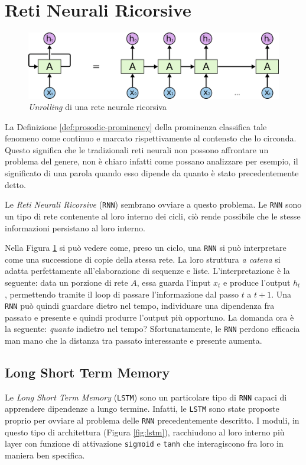 \documentclass[twoside,twocolumn,10pt]{extarticle}
\theoremstyle{definition}
\begin{document}
\section{Reti Neurali Ricorsive}\label{sec:rnn}
	\begin{figure}[h]
		\centering
		\includegraphics[scale=.4]{img/rnn.png}
		\caption{\textit{Unrolling} di una rete neurale ricorsiva}
		\label{fig:unroll}
	\end{figure}
	La Definizione \ref{def:prosodic-prominency} della prominenza classifica tale fenomeno come continuo e marcato rispettivamente al contensto che lo circonda. Questo significa che le tradizionali reti neurali non possono affrontare un problema del genere, non è chiaro infatti come possano analizzare per esempio, il significato di una parola quando esso dipende da quanto è stato precedentemente detto.
	
	Le \textit{Reti Neurali Ricorsive} (\texttt{RNN}) sembrano ovviare a questo problema. Le \texttt{RNN} sono un tipo di rete contenente al loro interno dei cicli, ciò rende possibile che le stesse informazioni persistano al loro interno.

	Nella Figura \ref{fig:unroll} si può vedere come, preso un ciclo, una \texttt{RNN} si può interpretare come una successione di copie della stessa rete. La loro struttura \textit{a catena} si adatta perfettamente all'elaborazione di sequenze e liste. L'interpretazione è la seguente: data un porzione di rete $A$, essa guarda l'input $x_t$ e produce l'output $h_t$, permettendo tramite il loop di passare l'informazione dal passo $t$ a $t + 1$. Una \texttt{RNN} può quindi guardare dietro nel tempo, individuare una dipendenza fra passato e presente e quindi produrre l'output più opportuno. La domanda ora è la seguente: \textit{quanto} indietro nel tempo? Sfortunatamente, le \texttt{RNN} perdono efficacia man mano che la distanza tra passato interessante e presente aumenta.
	
	\subsection{Long Short Term Memory}\label{subsec:lstm}
		Le \textit{Long Short Term Memory} (\texttt{LSTM}) sono un particolare tipo di \texttt{RNN} capaci di apprendere dipendenze a lungo termine. Infatti, le \texttt{LSTM} sono state proposte proprio per ovviare al problema delle \texttt{RNN} precedentemente descritto. I moduli, in questo tipo di architettura (Figura \ref{fig:lstm}), racchiudono al loro interno più layer con funzione di attivazione \texttt{sigmoid} e \texttt{tanh} che interagiscono fra loro in maniera ben specifica.
		
\end{document}
